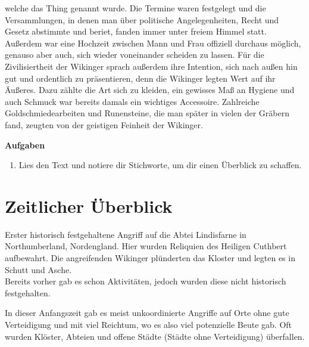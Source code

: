 \documentclass[12pt,a4paper,ngerman,openany]{book}
\newcommand{\aufgaben}[1]{
  \begin{tcolorbox}
    \textbf{Aufgaben}
    \begin{enumerate}
      #1
    \end{enumerate}
  \end{tcolorbox}
} %
\begin{document}
welche das \glqq Thing\grqq{} genannt wurde. Die Termine waren festgelegt und die Versammlungen, in denen man über politische Angelegenheiten, Recht und Gesetz abstimmte und beriet, fanden immer unter freiem Himmel statt.\\
Außerdem war eine Hochzeit zwischen Mann und Frau offiziell durchaus möglich, genauso aber auch, sich wieder voneinander scheiden zu lassen. 
Für die Zivilisiertheit der Wikinger sprach außerdem ihre Intention, sich nach außen hin gut und ordentlich zu präsentieren, denn die Wikinger legten Wert auf ihr Äußeres. Dazu zählte die Art sich zu kleiden,
ein gewisses Maß an Hygiene und auch Schmuck war bereits damals ein wichtiges Accessoire. Zahlreiche Goldschmiedearbeiten und Runensteine, die man später in vielen der Gräbern fand, zeugten von der geistigen Feinheit der Wikinger. 

\aufgaben {
  \item Lies den Text und notiere dir Stichworte, um dir einen Überblick zu schaffen.
}

\pagebreak

\section{Zeitlicher Überblick}

\begin{tcolorbox}[sharp corners, title=08. Juni 793]
Erster historisch festgehaltene Angriff auf die Abtei Lindisfarne in Northumberland, Nordengland. Hier wurden Reliquien des Heiligen Cuthbert aufbewahrt. Die angreifenden Wikinger plünderten das Kloster und legten es in Schutt und Asche.\\
Bereits vorher gab es schon Aktivitäten, jedoch wurden diese nicht historisch festgehalten.
\end{tcolorbox}

\begin{tcolorbox}[sharp corners, title=Ungefähr 800 bis 850]
In dieser Anfangszeit gab es meist unkoordinierte Angriffe auf Orte ohne gute Verteidigung und mit viel Reichtum, wo es also viel potenzielle Beute gab. Oft wurden Klöster, Abteien und offene Städte (Städte ohne Verteidigung) überfallen.
\end{tcolorbox}
\end{document}
